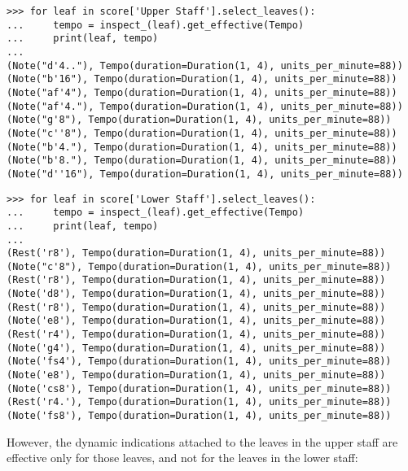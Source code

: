 \begin{abjadbookoutput}
\begin{singlespacing}
\vspace{-0.5\baselineskip}
\begin{lstlisting}
>>> for leaf in score['Upper Staff'].select_leaves():
...     tempo = inspect_(leaf).get_effective(Tempo)
...     print(leaf, tempo)
...
(Note("d'4.."), Tempo(duration=Duration(1, 4), units_per_minute=88))
(Note("b'16"), Tempo(duration=Duration(1, 4), units_per_minute=88))
(Note("af'4"), Tempo(duration=Duration(1, 4), units_per_minute=88))
(Note("af'4."), Tempo(duration=Duration(1, 4), units_per_minute=88))
(Note("g'8"), Tempo(duration=Duration(1, 4), units_per_minute=88))
(Note("c''8"), Tempo(duration=Duration(1, 4), units_per_minute=88))
(Note("b'4."), Tempo(duration=Duration(1, 4), units_per_minute=88))
(Note("b'8."), Tempo(duration=Duration(1, 4), units_per_minute=88))
(Note("d''16"), Tempo(duration=Duration(1, 4), units_per_minute=88))
\end{lstlisting}
\begin{lstlisting}
>>> for leaf in score['Lower Staff'].select_leaves():
...     tempo = inspect_(leaf).get_effective(Tempo)
...     print(leaf, tempo)
...
(Rest('r8'), Tempo(duration=Duration(1, 4), units_per_minute=88))
(Note("c'8"), Tempo(duration=Duration(1, 4), units_per_minute=88))
(Rest('r8'), Tempo(duration=Duration(1, 4), units_per_minute=88))
(Note('d8'), Tempo(duration=Duration(1, 4), units_per_minute=88))
(Rest('r8'), Tempo(duration=Duration(1, 4), units_per_minute=88))
(Note('e8'), Tempo(duration=Duration(1, 4), units_per_minute=88))
(Rest('r4'), Tempo(duration=Duration(1, 4), units_per_minute=88))
(Note('g4'), Tempo(duration=Duration(1, 4), units_per_minute=88))
(Note('fs4'), Tempo(duration=Duration(1, 4), units_per_minute=88))
(Note('e8'), Tempo(duration=Duration(1, 4), units_per_minute=88))
(Note('cs8'), Tempo(duration=Duration(1, 4), units_per_minute=88))
(Rest('r4.'), Tempo(duration=Duration(1, 4), units_per_minute=88))
(Note('fs8'), Tempo(duration=Duration(1, 4), units_per_minute=88))
\end{lstlisting}
\end{singlespacing}
\end{abjadbookoutput}

\noindent However, the dynamic indications attached to the leaves in the upper
staff are effective only for those leaves, and not for the leaves in the lower
staff:

\begin{comment}
<abjad>
for leaf in score['Upper Staff'].select_leaves():
    dynamic = inspect_(leaf).get_effective(Dynamic)
    print(leaf, dynamic)

for leaf in score['Lower Staff'].select_leaves():
    dynamic = inspect_(leaf).get_effective(Dynamic)
    print(leaf, dynamic)

</abjad>
\end{comment}

